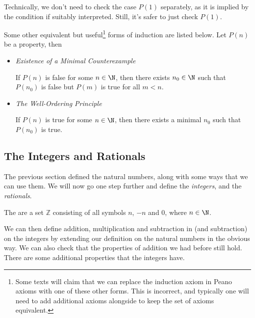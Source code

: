 \documentclass[a4paper]{scrartcl}
\begin{document}
\begin{remark}
	Technically, we don't need to check the case $P(1)$ separately, as it is implied by the condition if suitably interpreted. Still, it's safer to just check $P(1)$.
\end{remark}


Some other equivalent but useful\footnote{Some texts will claim that we can replace the induction axiom in Peano axioms with one of these other forms. This is incorrect, and typically one will need to add additional axioms alongside to keep the set of axioms equivalent.} forms of induction are listed below. Let $P(n)$ be a property, then
\begin{itemize}
	\item \emph{Existence of a Minimal Counterexample}
	
	If $P(n)$ is false for some $n \in \N$, then there exists $n_0 \in \N$ such that $P(n_0)$ is false but $P(m)$ is true for all $m < n$.

	\item \emph{The Well-Ordering Principle}
	
	If $P(n)$ is true for some $n \in \N$, then there exists a minimal $n_0$ such that $P(n_0)$ is true.
\end{itemize}

\subsection{The Integers and Rationals}

The previous section defined the natural numbers, along with some ways that we can use them. We will now go one step further and define the \emph{integers}, and the \emph{rationals}.

\begin{definition}[Integers]
	The  are a set $\mathbb{Z}$ consisting of all symbols $n$, $-n$ and 0, where $n \in \N$. 
\end{definition}

We can then define addition, multiplication and subtraction in (and subtraction) on the integers by extending our definition on the natural numbers in the obvious way. We can also check that the properties of addition we had before still hold. There are some additional properties that the integers have.
\end{document}
